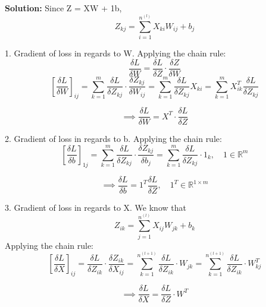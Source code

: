 \documentclass{article}
\newenvironment{solution}{\color{blue} \smallskip \textbf{Solution:}}{}
\begin{document}
\begin{solution}
    Since Z = XW + 1b,
	\[
Z_{kj} = \sum_{i=1}^{n^{(l)}} X_{ki} W_{ij} + b_j
\]

1. Gradient of loss in regards to W.
Applying the chain rule:
\[
\frac{\delta L}{\delta W} = \frac{\delta L}{\delta Z} \cdot \frac{\delta Z}{\delta W} \]
\[
\left[ \frac{\delta L}{\delta W} \right]_{ij} = \sum_{k=1}^{m} \frac{\delta L}{\delta Z_{kj}} \cdot \frac{\delta Z_{kj}}{\delta W_{ij}}
= \sum_{k=1}^{m} \frac{\delta L}{\delta Z_{kj}} X_{ki} = \sum_{k=1}^{m} X_{ik}^T \frac{\delta L}{\delta Z_{kj}}
\]

\[
\implies \frac{\delta L}{\delta W} = X^T \cdot \frac{\delta L}{\delta Z}
\]

2. Gradient of loss in regards to b.
Applying the chain rule:
\[
\left[ \frac{\delta L}{\delta b} \right]_{1j} = \sum_{k=1}^{m} \frac{\delta L}{\delta Z_{kj}} \cdot \frac{\delta Z_{kj}}{\delta b_j}
= \sum_{k=1}^{m} \frac{\delta L}{\delta Z_{kj}} \cdot 1_{k}, \quad 1 \in \mathbb{R}^{m}
\]

\[
\implies \frac{\delta L}{\delta b} = 1^T \frac{\delta L}{\delta Z}, \quad 1^T \in \mathbb{R}^{1 \times m}
\]

3. Gradient of loss in regards to X. We know that
\[
Z_{ik} = \sum_{j=1}^{n^{(l)}} X_{ij} W_{jk} + b_k
\]
Applying the chain rule:
\[
\left[ \frac{\delta L}{\delta X} \right]_{ij}  = \frac{\delta L}{\delta Z_{ik}} \cdot \frac{\delta Z_{ik}}{\delta X_{ij}} = \sum_{k=1}^{n^{(l+1)}} \frac{\delta L}{\delta Z_{ik}} \cdot W_{jk} = \sum_{k=1}^{n^{(l+1)}} \frac{\delta L}{\delta Z_{ik}} \cdot W_{kj}^T
\]

\[
\implies \frac{\delta L}{\delta X} = \frac{\delta L}{\delta Z} \cdot W^T
\]

	
\end{solution}

\newpage
\end{document}

